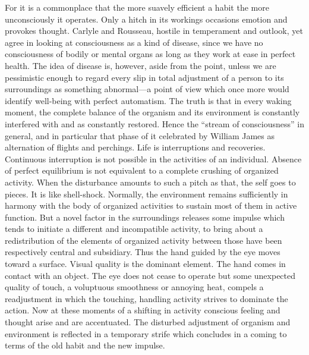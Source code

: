 \documentclass[12pt]{article}
\begin{document}
For it is a commonplace that the more suavely efficient
a habit the more unconsciously it operates. Only
a hitch in its workings occasions emotion and provokes
thought. Carlyle and Rousseau, hostile in temperament
and outlook, yet agree in looking at consciousness
as a kind of disease, since we have no consciousness
of bodily or mental organs as long as they work at ease
in perfect health. The idea of disease is, however, aside
from the point, unless we are pessimistic enough to
regard every slip in total adjustment of a person to its
surroundings as something abnormal---a point of view
which once more would identify well-being with perfect
automatism. The truth is that in every waking moment,
the complete balance of the organism and its
environment is constantly interfered with and as constantly
restored. Hence the ``stream of consciousness''
in general, and in particular that phase of it celebrated
by William James as alternation of flights and
perchings. Life is interruptions and recoveries. Continuous
interruption is not possible in the activities
of an individual. Absence of perfect equilibrium is not
equivalent to a complete crushing of organized activity.
When the disturbance amounts to such a pitch
as that, the self goes to pieces. It is like shell-shock.
Normally, the environment remains sufficiently in harmony
with the body of organized activities to sustain
most of them in active function. But a novel factor
in the surroundings releases some impulse which tends
to initiate a different and incompatible activity, to
bring about a redistribution of the elements of organized
activity between those have been respectively
central and subsidiary. Thus the hand guided by the
eye moves toward a surface. Visual quality is the dominant
element. The hand comes in contact with an
object. The eye does not cease to operate but some
unexpected quality of touch, a voluptuous smoothness
or annoying heat, compels a readjustment in which the
touching, handling activity strives to dominate the action.
Now at these moments of a shifting in activity
conscious feeling and thought arise and are accentuated.
The disturbed adjustment of organism and environment
is reflected in a temporary strife which concludes
in a coming to terms of the old habit and the new
impulse.
\end{document}
